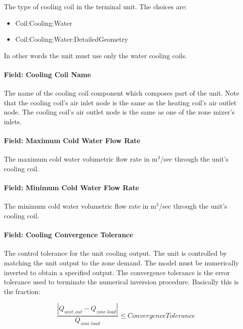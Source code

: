 The type of cooling coil in the terminal unit. The choices are:

\begin{itemize}
\item
  Coil:Cooling:Water
\item
  Coil:Cooling:Water:DetailedGeometry
\end{itemize}

In other words the unit must use only the water cooling coils.

\paragraph{Field: Cooling Coil Name}\label{field-cooling-coil-name}

The name of the cooling coil component which composes part of the unit. Note that the cooling coil's air inlet node is the same as the heating coil's air outlet node. The cooling coil's air outlet node is the same as one of the zone mixer's inlets.

\paragraph{Field: Maximum Cold Water Flow Rate}\label{field-maximum-cold-water-flow-rate}

The maximum cold water volumetric flow rate in m\(^{3}\)/sec through the unit's cooling coil.

\paragraph{Field: Minimum Cold Water Flow Rate}\label{field-minimum-cold-water-flow-rate}

The minimum cold water volumetric flow rate in m\(^{3}\)/sec through the unit's cooling coil.

\paragraph{Field: Cooling Convergence Tolerance}\label{field-cooling-convergence-tolerance}

The control tolerance for the unit cooling output. The unit is controlled by matching the unit output to the zone demand. The model must be numerically inverted to obtain a specified output. The convergence tolerance is the error tolerance used to terminate the numerical inversion procedure. Basically this is the fraction:

\begin{equation}
\frac{{\left| {{Q_{unit,out}} - {Q_{zone\;load}}} \right|}}{{{Q_{zone\;load}}}} \le ConvergenceTolerance
\end{equation}

